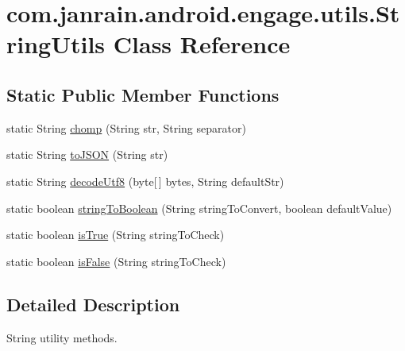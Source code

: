 \hypertarget{classcom_1_1janrain_1_1android_1_1engage_1_1utils_1_1_string_utils}{
\section{com.janrain.android.engage.utils.StringUtils Class Reference}
\label{classcom_1_1janrain_1_1android_1_1engage_1_1utils_1_1_string_utils}
}
\subsection*{Static Public Member Functions}
\begin{DoxyCompactItemize}
\item 
static String \hyperlink{classcom_1_1janrain_1_1android_1_1engage_1_1utils_1_1_string_utils_a82e87366185ed0e0f8c95c0a83f5c0ed}{chomp} (String str, String separator)
\item 
static String \hyperlink{classcom_1_1janrain_1_1android_1_1engage_1_1utils_1_1_string_utils_abe12573a4647346430f34852a0c61cf7}{toJSON} (String str)
\item 
static String \hyperlink{classcom_1_1janrain_1_1android_1_1engage_1_1utils_1_1_string_utils_a355cb95d338f3735241f3611726ca2a2}{decodeUtf8} (byte\mbox{[}$\,$\mbox{]} bytes, String defaultStr)
\item 
static boolean \hyperlink{classcom_1_1janrain_1_1android_1_1engage_1_1utils_1_1_string_utils_a8ebfcc4650a869e504cbf82f2745fb2f}{stringToBoolean} (String stringToConvert, boolean defaultValue)
\item 
static boolean \hyperlink{classcom_1_1janrain_1_1android_1_1engage_1_1utils_1_1_string_utils_ad632fb5d12294caba9c194b9aae4d9ed}{isTrue} (String stringToCheck)
\item 
static boolean \hyperlink{classcom_1_1janrain_1_1android_1_1engage_1_1utils_1_1_string_utils_a4fad9e7050023f99c362b507f61a70c4}{isFalse} (String stringToCheck)
\end{DoxyCompactItemize}


\subsection{Detailed Description}
String utility methods. 

